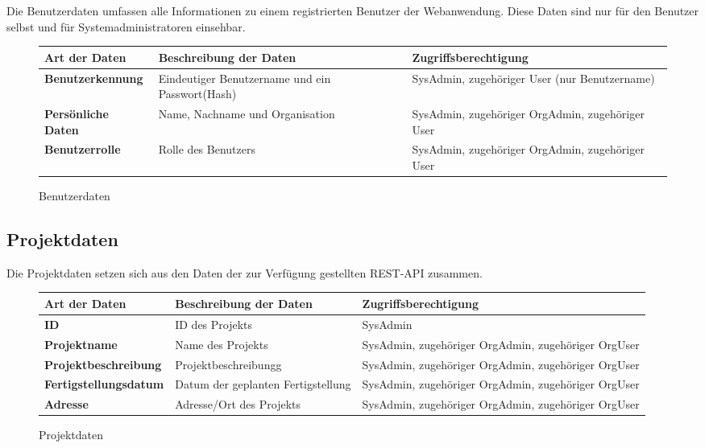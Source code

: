 Die Benutzerdaten umfassen alle Informationen zu einem registrierten Benutzer der Webanwendung. Diese Daten sind nur f\"ur den Benutzer selbst und f\"ur Systemadministratoren einsehbar.

\begin{figure}[h]
	\centering
	\begin{tabularx}{\textwidth}{| X || X | X |}
        \hline
		\textbf{Art der Daten} & \textbf{Beschreibung der Daten} & \textbf{Zugriffsberechtigung} \\ \hline \hline
		\textbf{Benutzerkennung} & Eindeutiger Benutzername und ein Passwort(Hash) & SysAdmin, zugehöriger User (nur Benutzername) \\ \hline
		\textbf{Persönliche Daten} & Name, Nachname und Organisation & SysAdmin, zugehöriger OrgAdmin, zugehöriger User \\ \hline
		\textbf{Benutzerrolle} & Rolle des Benutzers & SysAdmin, zugehöriger OrgAdmin, zugehöriger User \\ \hline
	\end{tabularx}
	\caption{Benutzerdaten}
	\label{fig:Benutzerdaten}
\end{figure}

\newpage

\subsection{Projektdaten}

Die Projektdaten setzen sich aus den Daten der zur Verf\"ugung gestellten REST-API zusammen.

\begin{figure}[h]
	\centering
	\begin{tabularx}{\textwidth}{| X || X | X |}
        \hline
		\textbf{Art der Daten} & \textbf{Beschreibung der Daten} & \textbf{Zugriffsberechtigung} \\ \hline \hline
        \textbf{ID} & ID des Projekts & SysAdmin \\ \hline
		\textbf{Projektname} & Name des Projekts & SysAdmin, zugehöriger OrgAdmin, zugehöriger OrgUser \\ \hline
		\textbf{Projektbeschreibung} & Projektbeschreibungg & SysAdmin, zugehöriger OrgAdmin, zugehöriger OrgUser \\ \hline
		\textbf{Fertigstellungsdatum} & Datum der geplanten Fertigstellung & SysAdmin, zugehöriger OrgAdmin, zugehöriger OrgUser \\ \hline
        \textbf{Adresse} & Adresse/Ort des Projekts & SysAdmin, zugehöriger OrgAdmin, zugehöriger OrgUser \\ \hline
	\end{tabularx}
	\caption{Projektdaten}
	\label{fig:Projektdaten}
\end{figure}

